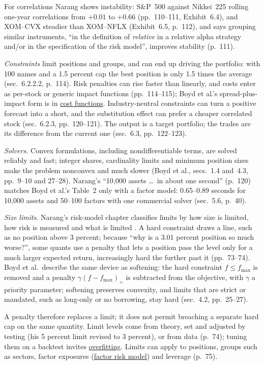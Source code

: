 \begin{qfmodel}
For correlations Narang shows instability: S\&P~500 against Nikkei~225 rolling one-year correlations from $+0.01$ to $+0.66$ (pp.~110--111, Exhibit~6.4), and XOM--CVX steadier than XOM--NFLX (Exhibit~6.5, p.~112), and says grouping similar instruments, ``in the definition of \emph{relative} in a relative alpha strategy and/or in the specification of the risk model'', improves stability (p.~111).

\emph{Constraints} limit positions and groups, and can end up driving the portfolio: with 100 names and a 1.5 percent cap the best position is only 1.5 times the average (sec.~6.2.2.2, p.~114). Risk penalties can rise faster than linearly, and costs enter as per-stock or generic impact functions (pp.~114--115); Boyd et al.'s spread-plus-impact form is in \hyperref[mod:portfolio-transaction-cost-function]{cost functions}. Industry-neutral constraints can turn a positive forecast into a short, and the substitution effect can prefer a cheaper correlated stock (sec.~6.2.3, pp.~120--121). The output is a target portfolio; the trades are its difference from the current one (sec.~6.3, pp.~122--123).

\emph{Solvers.} Convex formulations, including nondifferentiable terms, are solved reliably and fast; integer shares, cardinality limits and minimum position sizes make the problem nonconvex and much slower (Boyd et al., secs.~1.4 and~4.3, pp.~9--10 and 27--28). Narang's ``10{,}000 assets \dots\ in about one second'' (p.~120) matches Boyd et al.'s Table~2 only with a factor model: 0.65--0.89 seconds for 10{,}000 assets and 50--100 factors with one commercial solver (sec.~5.6, p.~40).

\emph{Size limits}. Narang's risk-model chapter classifies limits by how size is limited, how risk is measured and what is limited \citep[chap.~4, ``Risk Models'', sec.~4.1, pp.~73--76]{s7-narang}. A hard constraint draws a line, such as no position above 3 percent; because ``why is a 3.01 percent position so much worse?'', some quants use a penalty that lets a position pass the level only for a much larger expected return, increasingly hard the further past it (pp.~73--74). Boyd et al.\ describe the same device as softening: the hard constraint $f\le f_{\max}$ is removed and a penalty $\gamma(f-f_{\max})_+$ is subtracted from the objective, with $\gamma$ a priority parameter; softening preserves convexity, and limits that are strict or mandated, such as long-only or no borrowing, stay hard (sec.~4.2, pp.~25--27).

A penalty therefore replaces a limit; it does not permit breaching a separate hard cap on the same quantity. Limit levels come from theory, set and adjusted by testing (his 5 percent limit revised to 3 percent), or from data (p.~74); tuning them on a backtest invites \hyperref[pit:parameter-overfitting]{overfitting}. Limits can apply to positions, groups such as sectors, factor exposures (\hyperref[mod:factor-risk-model]{factor risk model}) and leverage (p.~75).


\end{qfmodel}
